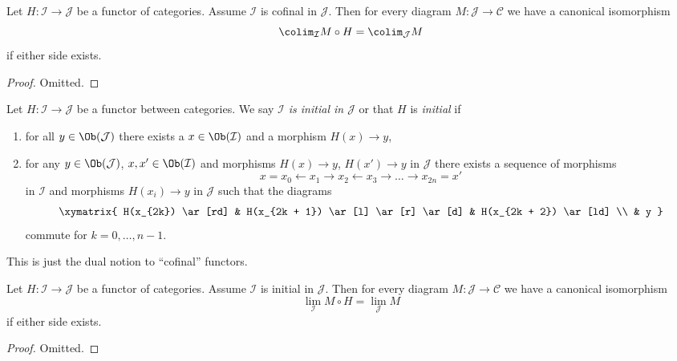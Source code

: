\begin{lemma}
\label{lemma-cofinal}
Let $H : \mathcal{I} \to \mathcal{J}$ be a functor of categories. Assume
$\mathcal{I}$ is cofinal in $\mathcal{J}$. Then for every diagram
$M : \mathcal{J} \to \mathcal{C}$ we have a canonical isomorphism
$$
\colim_\mathcal{I} M \circ H
=
\colim_\mathcal{J} M
$$
if either side exists.
\end{lemma}

\begin{proof}
Omitted.
\end{proof}

\begin{definition}
\label{definition-initial}
Let $H : \mathcal{I} \to \mathcal{J}$ be a functor between categories.
We say {\it $\mathcal{I}$ is initial in $\mathcal{J}$} or that
$H$ is {\it initial} if
\begin{enumerate}
\item for all $y \in \Ob(\mathcal{J})$ there exists a
$x \in \Ob(\mathcal{I})$ and a morphism $H(x) \to y$,
\item for any $y \in \Ob(\mathcal{J})$, $x , x' \in \Ob(\mathcal{I})$ and
morphisms $H(x) \to y$, $H(x') \to y$ in $\mathcal{J}$
there exists a sequence of morphisms
$$
x = x_0 \leftarrow x_1 \rightarrow x_2 \leftarrow x_3 \rightarrow \ldots
\rightarrow x_{2n} = x'
$$
in $\mathcal{I}$ and morphisms $H(x_i) \to y$ in $\mathcal{J}$
such that the diagrams
$$
\xymatrix{
H(x_{2k}) \ar[rd] &
H(x_{2k + 1}) \ar[l] \ar[r] \ar[d] &
H(x_{2k + 2}) \ar[ld] \\
& y
}
$$
commute for $k = 0, \ldots, n - 1$.
\end{enumerate}
\end{definition}

\noindent
This is just the dual notion to ``cofinal'' functors.

\begin{lemma}
\label{lemma-initial}
Let $H : \mathcal{I} \to \mathcal{J}$ be a functor of categories.
Assume $\mathcal{I}$ is initial in $\mathcal{J}$.
Then for every diagram $M : \mathcal{J} \to \mathcal{C}$ we
have a canonical isomorphism
$$
\lim_\mathcal{I} M \circ H = \lim_\mathcal{J} M
$$
if either side exists.
\end{lemma}

\begin{proof}
Omitted.
\end{proof}

